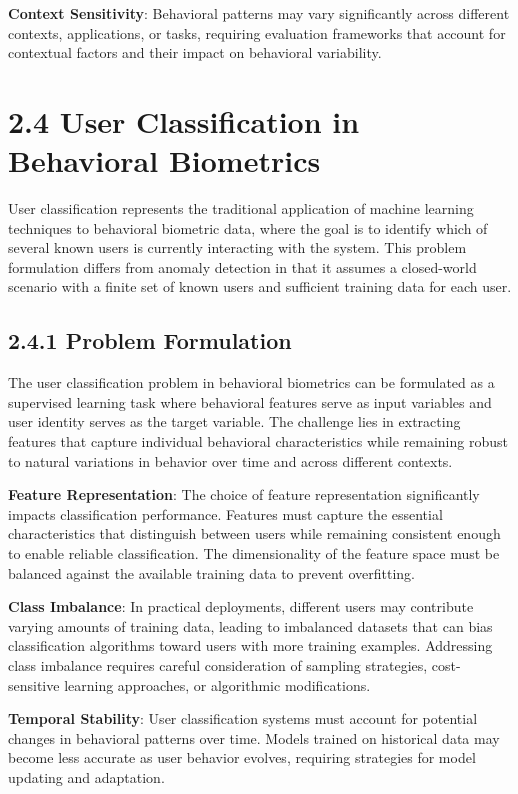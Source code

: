\documentclass[
  12pt,
  a4paper,
]{report}
\begin{document}
\textbf{Context Sensitivity}: Behavioral patterns may vary significantly
across different contexts, applications, or tasks, requiring evaluation
frameworks that account for contextual factors and their impact on
behavioral variability.

\section{2.4 User Classification in Behavioral
Biometrics}\label{user-classification-in-behavioral-biometrics}

User classification represents the traditional application of machine
learning techniques to behavioral biometric data, where the goal is to
identify which of several known users is currently interacting with the
system. This problem formulation differs from anomaly detection in that
it assumes a closed-world scenario with a finite set of known users and
sufficient training data for each user.

\subsection{2.4.1 Problem Formulation}\label{problem-formulation}

The user classification problem in behavioral biometrics can be
formulated as a supervised learning task where behavioral features serve
as input variables and user identity serves as the target variable. The
challenge lies in extracting features that capture individual behavioral
characteristics while remaining robust to natural variations in behavior
over time and across different contexts.

\textbf{Feature Representation}: The choice of feature representation
significantly impacts classification performance. Features must capture
the essential characteristics that distinguish between users while
remaining consistent enough to enable reliable classification. The
dimensionality of the feature space must be balanced against the
available training data to prevent overfitting.

\textbf{Class Imbalance}: In practical deployments, different users may
contribute varying amounts of training data, leading to imbalanced
datasets that can bias classification algorithms toward users with more
training examples. Addressing class imbalance requires careful
consideration of sampling strategies, cost-sensitive learning
approaches, or algorithmic modifications.

\textbf{Temporal Stability}: User classification systems must account
for potential changes in behavioral patterns over time. Models trained
on historical data may become less accurate as user behavior evolves,
requiring strategies for model updating and adaptation.
\end{document}
